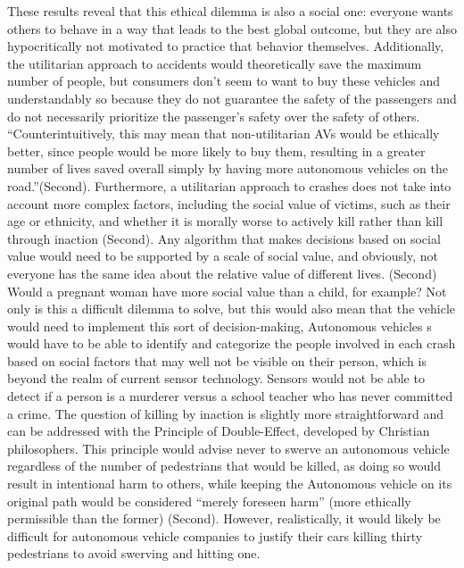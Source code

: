 \documentclass[10pt,twocolumn]{article}
\begin{document}
These results reveal that this ethical dilemma is also a social one: everyone wants others to behave in a way that leads to the best global outcome, but they are also hypocritically not motivated to practice that behavior themselves. Additionally, the utilitarian approach to accidents would theoretically save the maximum number of people, but consumers don’t seem to want to buy these vehicles and understandably so because they do not guarantee the safety of the passengers and do not necessarily prioritize the passenger’s safety over the safety of others. “Counterintuitively, this may mean that non-utilitarian AVs would be ethically better, since people would be more likely to buy them, resulting in a greater number of lives saved overall simply by having more autonomous vehicles on the road.”(Second). Furthermore, a utilitarian approach to crashes does not take into account more complex factors, including the social value of victims, such as their age or ethnicity, and whether it is morally worse to actively kill rather than kill through inaction (Second). Any algorithm that makes decisions based on social value would need to be supported by a scale of social value, and obviously, not everyone has the same idea about the relative value of different lives. (Second) Would a pregnant woman have more social value than a child, for example? Not only is this a difficult dilemma to solve, but this would also mean that the vehicle would need to implement this sort of decision-making, Autonomous vehicles s would have to be able to identify and categorize the people involved in each crash based on social factors that may well not be visible on their person, which is beyond the realm of current sensor technology. Sensors would not be able to detect if a person is a murderer versus a school teacher who has never committed a crime. The question of killing by inaction is slightly more straightforward and can be addressed with the Principle of Double-Effect, developed by Christian philosophers. This principle would advise never to swerve an autonomous vehicle regardless of the number of pedestrians that would be killed, as doing so would result in intentional harm to others, while keeping the Autonomous vehicle on its original path would be considered “merely foreseen harm” (more ethically permissible than the former) (Second). However, realistically, it would likely be difficult for autonomous vehicle companies to justify their cars killing thirty pedestrians to avoid swerving and hitting one. 
\end{document}

